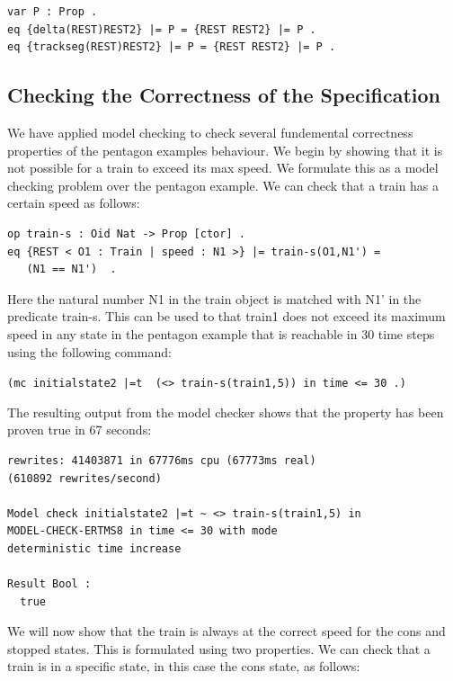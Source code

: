 \begin{lstlisting}[caption = Rewriting rules to deal with delta and trackseg operations]
var P : Prop .
eq {delta(REST)REST2} |= P = {REST REST2} |= P .
eq {trackseg(REST)REST2} |= P = {REST REST2} |= P .
\end{lstlisting}

\subsection*{Checking the  Correctness of the Specification}

We have applied model checking to check several fundemental correctness properties of the pentagon examples behaviour. We begin by showing that it is not possible for a train to exceed its max speed. We formulate this as a model checking problem over the pentagon example.  We can check that a train has a certain speed as follows:

\begin{lstlisting}[caption = The speed property]
op train-s : Oid Nat -> Prop [ctor] .
eq {REST < O1 : Train | speed : N1 >} |= train-s(O1,N1') = 
   (N1 == N1')  .
\end{lstlisting}

Here the natural number N1 in the train object is matched with N1' in the predicate train-s. This can be used to that train1 does not exceed its maximum speed in any state in the pentagon  example that is reachable in 30 time steps using the following command:

\begin{center}
\texttt{(mc initialstate2 |=t  ~(<> train-s(train1,5)) in time <= 30 .)}
\end{center}

The resulting output from the model checker shows that the property has been proven true in 67 seconds:

\begin{lstlisting}
rewrites: 41403871 in 67776ms cpu (67773ms real)
(610892 rewrites/second)

Model check initialstate2 |=t ~ <> train-s(train1,5) in 
MODEL-CHECK-ERTMS8 in time <= 30 with mode
deterministic time increase

Result Bool :
  true
\end{lstlisting}

We will now show that the train is always at the correct speed for the cons and stopped states. This is formulated using two properties. We can check that a train is in a specific state, in this case the cons state, as follows:

